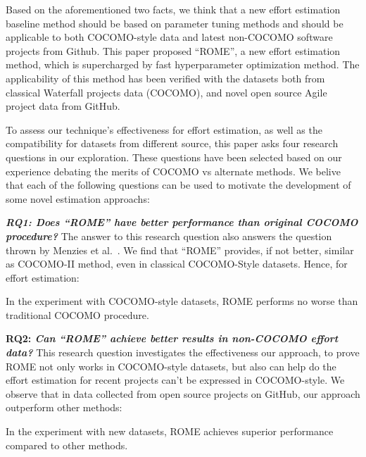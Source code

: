Based on the aforementioned two facts, we think that a new effort estimation baseline method should be based on parameter tuning methods and should be applicable to both COCOMO-style data and latest non-COCOMO software projects from Github. This paper proposed ``ROME'', a new effort estimation method, which is supercharged by fast hyperparameter optimization method. The applicability of this method has been verified  with the datasets both from classical Waterfall projects data (COCOMO), and novel open source Agile project data from GitHub. 



To assess our technique's effectiveness for effort estimation, as well as the compatibility for datasets from different source, this paper asks four research questions in our exploration. These questions have been selected based on our experience debating the merits of COCOMO vs alternate methods. We belive that each of the following questions can be used to motivate the development of some  novel estimation approachs:


{\bf \em RQ1: Does ``ROME'' have better performance than original COCOMO procedure?} The answer to this research question also answers the question thrown by Menzies et al.~\cite{MenziesNeg:2017}. 
We find that ``ROME'' provides, if not better, similar as COCOMO-II method, even in classical COCOMO-Style datasets. Hence, for effort estimation:
 \begin{result}{1}
 In the experiment with COCOMO-style datasets, ROME performs no worse than traditional COCOMO procedure.
 \end{result}

{\bf RQ2: \em  Can ``ROME'' achieve better results in non-COCOMO effort data?}
 This research question investigates the effectiveness our approach, to prove ROME not only works in COCOMO-style datasets, but also can help  do the effort estimation for recent projects can't be expressed in COCOMO-style. We observe that in data collected from open source projects on GitHub, our approach outperform other methods:
 \begin{result}{2}
 In the experiment with new datasets, ROME achieves superior performance compared to other methods.
 \end{result}
 


